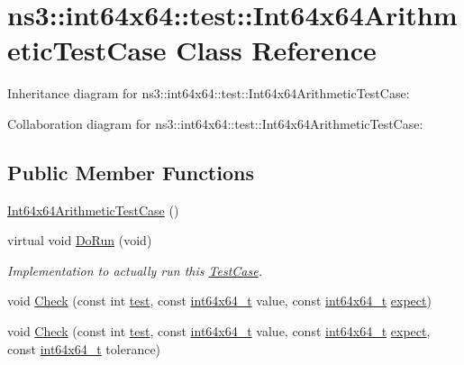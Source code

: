 \hypertarget{classns3_1_1int64x64_1_1test_1_1Int64x64ArithmeticTestCase}{}\section{ns3\+:\+:int64x64\+:\+:test\+:\+:Int64x64\+Arithmetic\+Test\+Case Class Reference}
\label{classns3_1_1int64x64_1_1test_1_1Int64x64ArithmeticTestCase}


Inheritance diagram for ns3\+:\+:int64x64\+:\+:test\+:\+:Int64x64\+Arithmetic\+Test\+Case\+:


Collaboration diagram for ns3\+:\+:int64x64\+:\+:test\+:\+:Int64x64\+Arithmetic\+Test\+Case\+:
\subsection*{Public Member Functions}
\begin{DoxyCompactItemize}
\item 
\hyperlink{classns3_1_1int64x64_1_1test_1_1Int64x64ArithmeticTestCase_a59e2d048d050f53c0195f9d3ef95dea6}{Int64x64\+Arithmetic\+Test\+Case} ()
\item 
virtual void \hyperlink{classns3_1_1int64x64_1_1test_1_1Int64x64ArithmeticTestCase_accf4174c2c478a41ad69700d3cc95de4}{Do\+Run} (void)
\begin{DoxyCompactList}\small\item\em Implementation to actually run this \hyperlink{classns3_1_1TestCase}{Test\+Case}. \end{DoxyCompactList}\item 
void \hyperlink{classns3_1_1int64x64_1_1test_1_1Int64x64ArithmeticTestCase_a471c01814da4b0b5c4082b7ce1c46dfe}{Check} (const int \hyperlink{main-test-sync_8cc_a708a4c1a4d0c4acc4c447310dd4db27f}{test}, const \hyperlink{classint64x64__t}{int64x64\+\_\+t} value, const \hyperlink{classint64x64__t}{int64x64\+\_\+t} \hyperlink{doc_2readme_8txt_a11460adc33d00ccf94a559cdd45990ea}{expect})
\item 
void \hyperlink{classns3_1_1int64x64_1_1test_1_1Int64x64ArithmeticTestCase_ac8ded5c10f35f51bf9e6a33ed9f34200}{Check} (const int \hyperlink{main-test-sync_8cc_a708a4c1a4d0c4acc4c447310dd4db27f}{test}, const \hyperlink{classint64x64__t}{int64x64\+\_\+t} value, const \hyperlink{classint64x64__t}{int64x64\+\_\+t} \hyperlink{doc_2readme_8txt_a11460adc33d00ccf94a559cdd45990ea}{expect}, const \hyperlink{classint64x64__t}{int64x64\+\_\+t} tolerance)
\end{DoxyCompactItemize}
